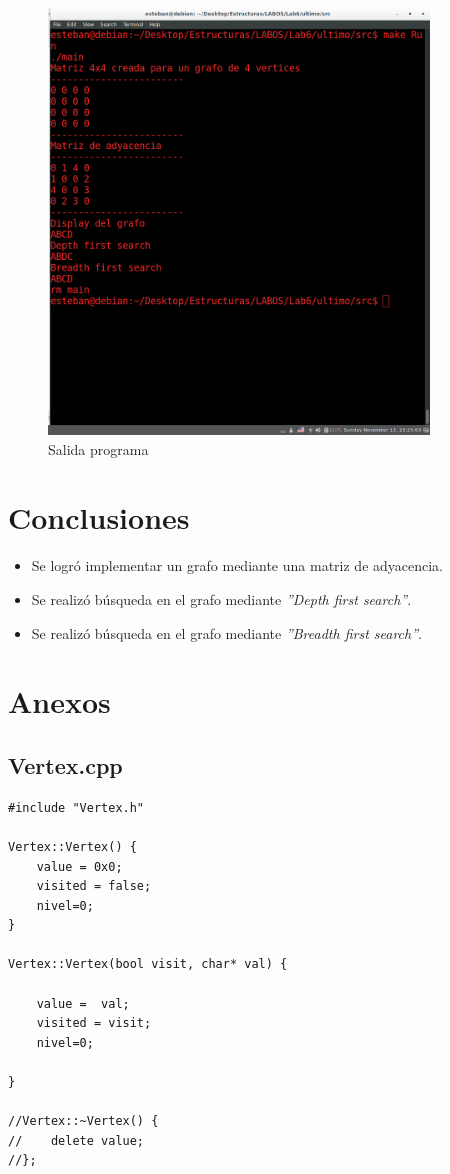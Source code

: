 \documentclass[11pt]{article}
\begin{document}
\begin{figure}[h!]
\centering
\includegraphics[width=0.9\textwidth]{cap.png}
\caption{\label{fig:2} Salida programa}
\end{figure}





\newpage
\section{Conclusiones}
\begin{itemize}
\item Se logró implementar un grafo mediante una matriz de adyacencia.
\item Se realizó búsqueda en el grafo mediante \textit{''Depth first search''}.
\item Se realizó búsqueda en el grafo mediante \textit{''Breadth first search''}.
\end{itemize}
\newpage
 
\section{Anexos}
\subsection{Vertex.cpp}
\lstset {language=C}
\begin{lstlisting}
#include "Vertex.h"

Vertex::Vertex() {
    value = 0x0;
    visited = false;
    nivel=0;
}

Vertex::Vertex(bool visit, char* val) {

    value =  val;
    visited = visit;
    nivel=0;

}

//Vertex::~Vertex() {
//    delete value;
//};

\end{lstlisting}
\newpage 
\end{document}
